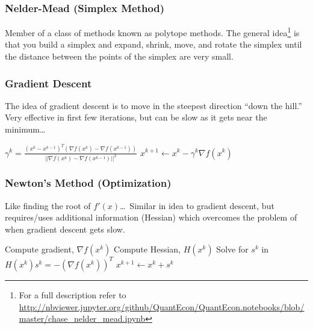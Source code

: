 \documentclass[10pt]{beamer}
\begin{document}
\begin{frame} \frametitle{Nelder-Mead (Simplex Method)}

  Member of a class of methods known as polytope methods. The general idea\footnote{For a full description refer to \url{http://nbviewer.jupyter.org/github/QuantEcon/QuantEcon.notebooks/blob/master/chase_nelder_mead.ipynb}} is that you build a simplex and expand, shrink, move, and rotate the simplex until the distance between the points of the simplex are very small.

\end{frame}

\begin{frame} \frametitle{Gradient Descent}

  The idea of gradient descent is to move in the steepest direction ``down the hill.'' Very effective in first few iterations, but can be slow as it gets near the minimum\dots

  \vspace{0.5cm}

  \begin{algorithmic}

      \STATE $\gamma^k = \frac{(x^k - x^{k-1})^T (\nabla f(x^k) - \nabla f(x^{k-1}))}{||\nabla f(x^k) - \nabla f(x^{k-1})||^2}$
      \STATE $x^{k+1} \leftarrow x^k - \gamma^k \nabla f(x^k)$
    \ENDWHILE

  \end{algorithmic}

\end{frame}

\begin{frame} \frametitle{Newton's Method (Optimization)}

  Like finding the root of $f'(x)$\dots\ Similar in idea to gradient descent, but requires/uses additional information (Hessian) which overcomes the problem of when gradient descent gets slow.

  \vspace{0.5cm}

  \begin{algorithmic}

    \STATE Compute gradient, $\nabla f (x^k)$
    \STATE Compute Hessian, $H(x^k)$
    \STATE Solve for $s^k$ in $H(x^k) s^k = -(\nabla f(x^k))^T $
    \STATE $x^{k+1} \leftarrow x^k + s^k$
    \ENDWHILE

  \end{algorithmic}

\end{frame}
\end{document}
